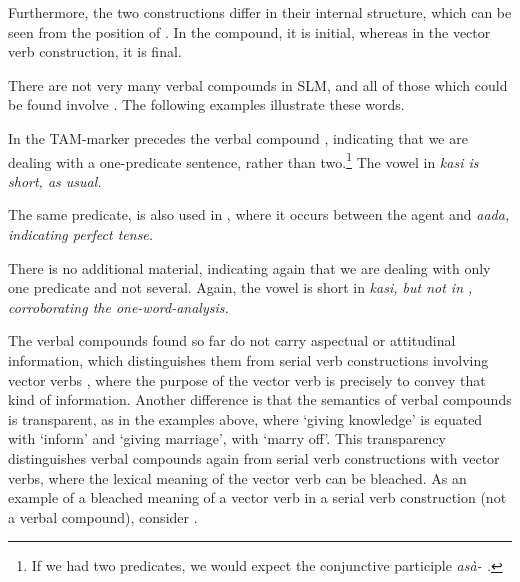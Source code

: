 Furthermore, the two constructions differ in their internal structure, which can be seen from the position of . In the compound, it is initial, whereas in the vector verb construction, it is final.

There are not very many verbal compounds in SLM, and all of those which could be found involve .
The following examples illustrate these words.


In  the TAM-marker precedes the verbal compound , indicating that we are dealing with a one-predicate sentence, rather than two.\footnote{If we had two predicates, we would expect the conjunctive participle \em asà- \em {}.}
 The vowel in \em kasi \em is short, as usual.



The same predicate,  is also used in , where it occurs between the agent  and \em aada, \em indicating perfect tense.


There is no additional material, indicating again that we are dealing with only one predicate and not several. Again, the vowel is short in \em kasi\em, but not in , corroborating the one-word-analysis.

The verbal compounds found so far do not carry aspectual or attitudinal information, which distinguishes them from serial verb constructions involving vector verbs , where the  purpose of the vector verb is precisely to convey that kind of information. Another difference is that the semantics of verbal compounds is transparent, as in the examples above, where `giving knowledge' is equated with `inform' and `giving marriage', with `marry off'.  This transparency distinguishes verbal compounds again from serial verb constructions with vector verbs, where the lexical meaning of the vector verb can be bleached.
As an example of a bleached meaning of a vector verb in a serial verb construction (not a verbal compound), consider .

